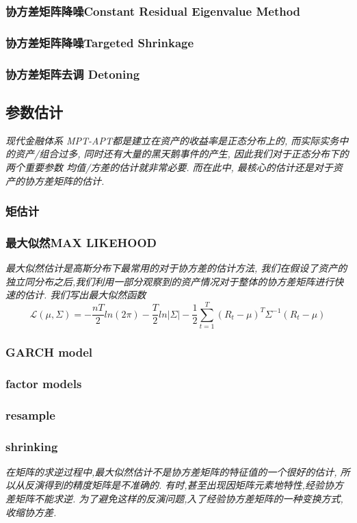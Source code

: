 \documentclass{scrartcl}
\numberwithin{equation}{section}
\begin{document}
\subsubsection{协方差矩阵降噪Constant Residual Eigenvalue Method}
\subsubsection{协方差矩阵降噪Targeted Shrinkage}

\subsubsection{协方差矩阵去调 Detoning}



\subsection{参数估计}
\textsl{现代金融体系 MPT-APT都是建立在资产的收益率是正态分布上的, 而实际实务中的资产/组合过多, 同时还有大量的黑天鹅事件的产生, 因此我们对于正态分布下的两个重要参数 均值/方差的估计就非常必要. 而在此中, 最核心的估计还是对于资产的协方差矩阵的估计.}
\subsubsection{矩估计}
\subsubsection{最大似然MAX LIKEHOOD}
\textsl{最大似然估计是高斯分布下最常用的对于协方差的估计方法, 我们在假设了资产的独立同分布之后,我们利用一部分观察到的资产情况对于整体的协方差矩阵进行快速的估计. 我们写出最大似然函数 }
$$\mathcal{L}(\mu, \Sigma) = -\frac{nT}{2}ln(2\pi) - \frac{T}{2} ln|\Sigma| - \frac{1}{2} \sum_{t=1}^T (R_t -\mu)^T\Sigma^{-1}(R_t -\mu)$$



\subsubsection{ GARCH model }
\subsubsection{ factor models}

\subsubsection{resample}
\subsubsection{ shrinking }
\textsl{
    在矩阵的求逆过程中,最大似然估计不是协方差矩阵的特征值的一个很好的估计, 所以从反演得到的精度矩阵是不准确的. 有时,甚至出现因矩阵元素地特性,经验协方差矩阵不能求逆. 为了避免这样的反演问题,入了经验协方差矩阵的一种变换方式,收缩协方差.
}
\end{document}
